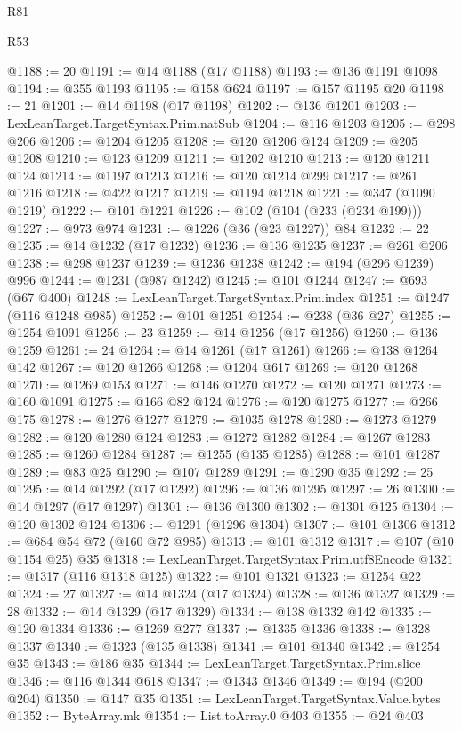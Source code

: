 \begin{lexlean}{R81}
\begin{lexlean}{R53}
\begin{coremodule}
{{{{{{{{{{{{{{{{{{{{{{{{{{{{{{{{{{{{{{{{{{{{{{{{{{{{{{{{{{{{{{{{{{{{{{{{{{{{{{{{{{{{{{{{{{{{{{{{{{{{{{{{{{{{{{{{@1188 := 20
@1191 := @14 @1188 (@17 @1188)
@1193 := @136 @1191 @1098
@1194 := @355 @1193
@1195 := @158 @624
@1197 := @157 @1195 @20
@1198 := 21
@1201 := @14 @1198 (@17 @1198)
@1202 := @136 @1201
@1203 := LexLeanTarget.TargetSyntax.Prim.natSub
@1204 := @116 @1203
@1205 := @298 @206
@1206 := @1204 @1205
@1208 := @120 @1206 @124
@1209 := @205 @1208
@1210 := @123 @1209
@1211 := @1202 @1210
@1213 := @120 @1211 @124
@1214 := @1197 @1213
@1216 := @120 @1214 @299
@1217 := @261 @1216
@1218 := @422 @1217
@1219 := @1194 @1218
@1221 := @347 (@1090 @1219)
@1222 := @101 @1221
@1226 := @102 (@104 (@233 (@234 @199)))
@1227 := @973 @974
@1231 := @1226 (@36 (@23 @1227)) @84
@1232 := 22
@1235 := @14 @1232 (@17 @1232)
@1236 := @136 @1235
@1237 := @261 @206
@1238 := @298 @1237
@1239 := @1236 @1238
@1242 := @194 (@296 @1239) @996
@1244 := @1231 (@987 @1242)
@1245 := @101 @1244
@1247 := @693 (@67 @400)
@1248 := LexLeanTarget.TargetSyntax.Prim.index
@1251 := @1247 (@116 @1248 @985)
@1252 := @101 @1251
@1254 := @238 (@36 @27)
@1255 := @1254 @1091
@1256 := 23
@1259 := @14 @1256 (@17 @1256)
@1260 := @136 @1259
@1261 := 24
@1264 := @14 @1261 (@17 @1261)
@1266 := @138 @1264 @142
@1267 := @120 @1266
@1268 := @1204 @617
@1269 := @120 @1268
@1270 := @1269 @153
@1271 := @146 @1270
@1272 := @120 @1271
@1273 := @160 @1091
@1275 := @166 @82 @124
@1276 := @120 @1275
@1277 := @266 @175
@1278 := @1276 @1277
@1279 := @1035 @1278
@1280 := @1273 @1279
@1282 := @120 @1280 @124
@1283 := @1272 @1282
@1284 := @1267 @1283
@1285 := @1260 @1284
@1287 := @1255 (@135 @1285)
@1288 := @101 @1287
@1289 := @83 @25
@1290 := @107 @1289
@1291 := @1290 @35
@1292 := 25
@1295 := @14 @1292 (@17 @1292)
@1296 := @136 @1295
@1297 := 26
@1300 := @14 @1297 (@17 @1297)
@1301 := @136 @1300
@1302 := @1301 @125
@1304 := @120 @1302 @124
@1306 := @1291 (@1296 @1304)
@1307 := @101 @1306
@1312 := @684 @54 @72 (@160 @72 @985)
@1313 := @101 @1312
@1317 := @107 (@10 @1154 @25) @35
@1318 := LexLeanTarget.TargetSyntax.Prim.utf8Encode
@1321 := @1317 (@116 @1318 @125)
@1322 := @101 @1321
@1323 := @1254 @22
@1324 := 27
@1327 := @14 @1324 (@17 @1324)
@1328 := @136 @1327
@1329 := 28
@1332 := @14 @1329 (@17 @1329)
@1334 := @138 @1332 @142
@1335 := @120 @1334
@1336 := @1269 @277
@1337 := @1335 @1336
@1338 := @1328 @1337
@1340 := @1323 (@135 @1338)
@1341 := @101 @1340
@1342 := @1254 @35
@1343 := @186 @35
@1344 := LexLeanTarget.TargetSyntax.Prim.slice
@1346 := @116 @1344 @618
@1347 := @1343 @1346
@1349 := @194 (@200 @204)
@1350 := @147 @35
@1351 := LexLeanTarget.TargetSyntax.Value.bytes
@1352 := ByteArray.mk
@1354 := List.toArray.{0} @403
@1355 := @24 @403
}}}}}}}}}}}}}}}}}}}}}}}}}}}}}}}}}}}}}}}}}}}}}}}}}}}}}}}}}}}}}}}}}}}}}}}}}}}}}}}}}}}}}}}}}}}}}}}}}}}}}}}}}}}}}}}}
\end{coremodule}
\end{lexlean}
\end{lexlean}
